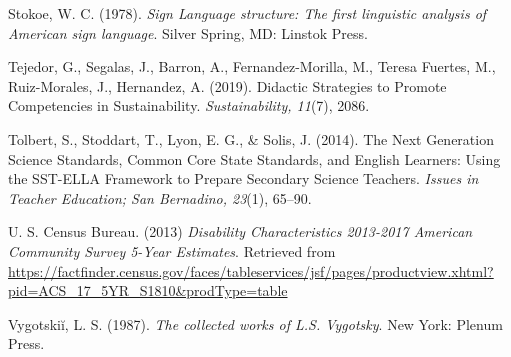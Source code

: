 \documentclass[11.5pt]{sig-alternate} %
\begin{document}
\begin{hangparas}{0.25in}{1}
Stokoe, W. C. (1978). \textit{Sign Language structure: The first linguistic analysis of American sign language}. Silver Spring, MD: Linstok Press.

Tejedor, G., Segalas, J., Barron, A., Fernandez-Morilla, M., Teresa Fuertes, M., Ruiz-Morales, J., Hernandez, A. (2019). Didactic Strategies to Promote Competencies in Sustainability. \textit{Sustainability, 11}(7), 2086. 

Tolbert, S., Stoddart, T., Lyon, E. G., \& Solis, J. (2014). The Next Generation Science Standards, Common Core State Standards, and English Learners: Using the SST-ELLA Framework to Prepare Secondary Science Teachers.\textit{ Issues in Teacher Education; San Bernadino, 23}(1), 65–90. 

U. S. Census Bureau. (2013) \textit{Disability Characteristics 2013-2017 American Community Survey 5-Year Estimates}. Retrieved from \url{https://factfinder.census.gov/faces/tableservices/jsf/pages/productview.xhtml?pid=ACS\_17\_5YR\_S1810\&prodType=table}

Vygotskiĭ, L. S. (1987). \textit{The collected works of L.S. Vygotsky}. New York: Plenum Press.
\end{hangparas}

\clearpage
\onecolumn

\setcounter{table}{0}
\renewcommand{\thetable}{A\arabic{table}}
\end{document}
